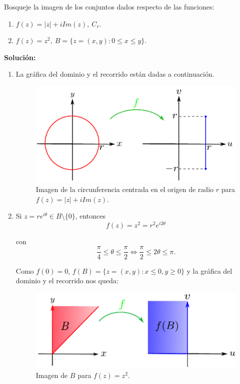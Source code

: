 \begin{ejemplo}
Bosqueje la imagen de los conjuntos dados respecto de las funciones:

\begin{enumerate}
\item $f(z) = |z| + i Im(z), ~ C_r$.

\item $f(z) = z^2, ~ B = \{z = (x,y) : 0 \leq x \leq y\}$.
\end{enumerate}

\textbf{Solución:}

\begin{enumerate}
\item La gráfica del dominio y el recorrido están dadas a continuación.

\begin{figure}[H]
    \centering
    \includegraphics[scale=0.6]{Figuras/EjemploFuncion1.pdf}
    \caption{Imagen de la circunferencia centrada en el origen de radio $r$ para $f(z) = |z| + i Im(z)$.}
    \label{EjemploFuncion1}
\end{figure}

\item Si $z = r e^{i\theta} \in B\setminus \{0\}$, entonces
$$f(z) = z^2 = r^2 e^{i2\theta}$$

con 
$$\frac{\pi}{4} \leq \theta \leq \frac{\pi}{2} \Leftrightarrow \frac{\pi}{2} \leq 2\theta \leq \pi.$$

Como $f(0) = 0$, $f(B) = \{ z= (x,y) : x \leq 0, y \geq 0\}$ y la gráfica del dominio y el recorrido nos queda:

\begin{figure}[H]
    \centering
    \includegraphics[scale=0.7]{Figuras/EjemploFuncion2.pdf}
    \caption{Imagen de $B$ para $f(z) = z^2$.}
    \label{EjemploFuncion2}
\end{figure}

\end{enumerate}
\end{ejemplo}

